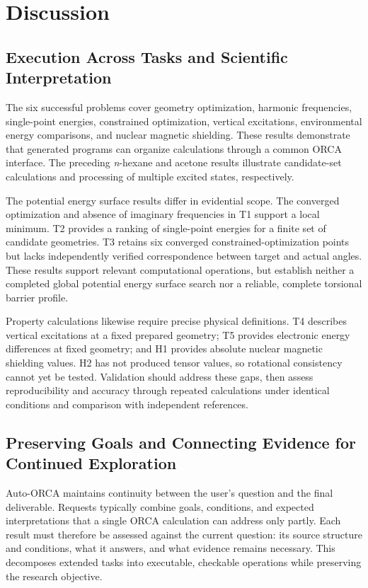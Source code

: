 \section{Discussion}
\subsection{Execution Across Tasks and Scientific Interpretation}
The six successful problems cover geometry optimization, harmonic frequencies, single-point energies,
constrained optimization, vertical excitations, environmental energy comparisons, and nuclear magnetic shielding.
These results demonstrate that generated programs can organize calculations through a common ORCA interface.
The preceding \textit{n}-hexane and acetone results illustrate candidate-set calculations
and processing of multiple excited states, respectively.

The potential energy surface results differ in evidential scope.
The converged optimization and absence of imaginary frequencies in T1 support a local minimum.
T2 provides a ranking of single-point energies for a finite set of candidate geometries.
T3 retains six converged constrained-optimization points but lacks independently verified correspondence between target and actual angles.
These results support relevant computational operations,
but establish neither a completed global potential energy surface search nor a reliable, complete torsional barrier profile.

Property calculations likewise require precise physical definitions.
T4 describes vertical excitations at a fixed prepared geometry; T5 provides electronic energy differences at fixed geometry;
and H1 provides absolute nuclear magnetic shielding values.
H2 has not produced tensor values, so rotational consistency cannot yet be tested.
Validation should address these gaps, then assess reproducibility and accuracy through repeated calculations
under identical conditions and comparison with independent references.

\subsection{Preserving Goals and Connecting Evidence for Continued Exploration}
Auto-ORCA maintains continuity between the user's question and the final deliverable.
Requests typically combine goals, conditions, and expected interpretations that a single ORCA calculation can address only partly.
Each result must therefore be assessed against the current question: its source structure and conditions,
what it answers, and what evidence remains necessary.
This decomposes extended tasks into executable, checkable operations while preserving the research objective.

